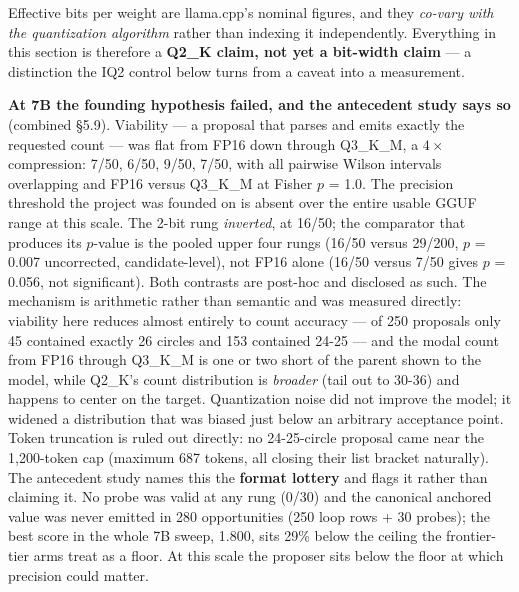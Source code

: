 \documentclass[11pt]{article}
\begin{document}
Effective bits per weight are llama.cpp's nominal figures, and they \emph{co-vary with the
quantization algorithm} rather than indexing it independently. Everything in this section
is therefore a \textbf{Q2\_K claim, not yet a bit-width claim} --- a distinction the IQ2 control
below turns from a caveat into a measurement.

\textbf{At 7B the founding hypothesis failed, and the antecedent study says so} (combined
\S5.9). Viability --- a proposal that parses and emits exactly the requested count --- was
flat from FP16 down through Q3\_K\_M, a $4\times$ compression: 7/50, 6/50, 9/50, 7/50, with all
pairwise Wilson intervals overlapping and FP16 versus Q3\_K\_M at Fisher $p$ = 1.0. The
precision threshold the project was founded on is absent over the entire usable GGUF
range at this scale. The 2-bit rung \emph{inverted}, at 16/50; the comparator that produces
its $p$-value is the pooled upper four rungs (16/50 versus 29/200, $p$ = 0.007
uncorrected, candidate-level), not FP16 alone (16/50 versus 7/50 gives $p$ = 0.056, not
significant). Both contrasts are post-hoc and disclosed as such. The mechanism is
arithmetic rather than semantic and was measured directly: viability here reduces almost
entirely to count accuracy --- of 250 proposals only 45 contained exactly 26 circles and
153 contained 24-25 --- and the modal count from FP16 through Q3\_K\_M is one or two short of
the parent shown to the model, while Q2\_K's count distribution is \emph{broader} (tail out to
30-36) and happens to center on the target. Quantization noise did not improve the model;
it widened a distribution that was biased just below an arbitrary acceptance point. Token
truncation is ruled out directly: no 24-25-circle proposal came near the 1,200-token cap
(maximum 687 tokens, all closing their list bracket naturally). The antecedent study
names this the \textbf{format lottery} and flags it rather than claiming it. No probe was
valid at any rung (0/30) and the canonical anchored value was never emitted in 280
opportunities (250 loop rows + 30 probes); the best score in the whole 7B sweep, 1.800,
sits 29\% below the ceiling the frontier-tier arms treat as a floor. At this scale the
proposer sits below the floor at which precision could matter.
\end{document}
